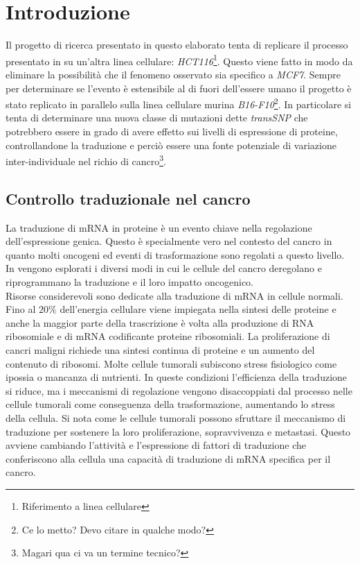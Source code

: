 \chapter{Introduzione}
\label{cha:intro}




Il progetto di ricerca presentato in questo elaborato tenta di replicare il processo presentato in \cite{transsnp} su un'altra linea cellulare: \emph{HCT116}\footnote{Riferimento a linea cellulare}.
Questo viene fatto in modo da eliminare la possibilit\`a che il fenomeno osservato sia specifico a \emph{MCF7}.
Sempre per determinare se l'evento \`e estensibile al di fuori dell'essere umano il progetto \`e stato replicato in parallelo sulla linea cellulare murina \emph{B16-F10}\footnote{Ce lo metto? Devo citare in qualche modo?}.
In particolare si tenta di determinare una nuova classe di mutazioni dette \emph{transSNP} che potrebbero essere in grado di avere effetto sui livelli di espressione di proteine, controllandone la traduzione e perci\`o essere una fonte potenziale di variazione inter-individuale nel richio di cancro\footnote{Magari qua ci va un termine tecnico?}.

\section{Controllo traduzionale nel cancro}
La traduzione di mRNA in proteine \`e un evento chiave nella regolazione dell'espressione genica.
Questo \`e specialmente vero nel contesto del cancro in quanto molti oncogeni ed eventi di trasformazione sono regolati a questo livello.
In \cite{tranconcancer} vengono esplorati i diversi modi in cui le cellule del cancro deregolano e riprogrammano la traduzione e il loro impatto oncogenico.\\
Risorse considerevoli sono dedicate alla traduzione di mRNA in cellule normali.
Fino al $20\%$ dell'energia cellulare viene impiegata nella sintesi delle proteine e anche la maggior parte della trascrizione \`e volta alla produzione di RNA ribosomiale e di mRNA codificante proteine ribosomiali.
La proliferazione di cancri maligni richiede una sintesi continua di proteine e un aumento del contenuto di ribosomi.
Molte cellule tumorali subiscono stress fisiologico come ipossia o mancanza di nutrienti.
In queste condizioni l'efficienza della traduzione si riduce, ma i meccanismi di regolazione vengono disaccoppiati dal processo nelle cellule tumorali come conseguenza della trasformazione, aumentando lo stress della cellula.
Si nota come le cellule tumorali possono sfruttare il meccanismo di traduzione per sostenere la loro proliferazione, sopravvivenza e metastasi.
Questo avviene cambiando l'attivit\`a e l'espressione di fattori di traduzione che conferiscono alla cellula una capacit\`a di traduzione di mRNA specifica per il cancro.

